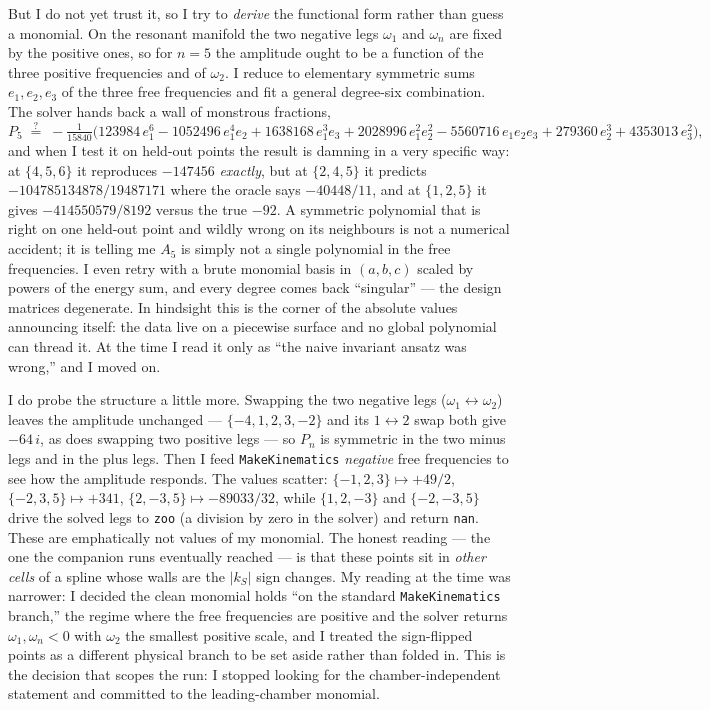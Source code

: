 \documentclass{article}
\begin{document}
But I do not yet trust it, so I try to \emph{derive} the functional form rather
than guess a monomial. On the resonant manifold the two negative legs $\omega_1$
and $\omega_n$ are fixed by the positive ones, so for $n=5$ the amplitude ought to
be a function of the three positive frequencies and of $\omega_2$. I reduce
to elementary symmetric sums $e_1,e_2,e_3$ of the three free frequencies and fit a
general degree-six combination. The solver hands back a wall of monstrous
fractions,
\[
P_5 \;\stackrel{?}{=}\; -\tfrac{1}{15840}\big(123984\,e_1^6 - 1052496\,e_1^4 e_2
+ 1638168\,e_1^3 e_3 + 2028996\,e_1^2 e_2^2 - 5560716\,e_1 e_2 e_3
+ 279360\,e_2^3 + 4353013\,e_3^2\big),
\]
and when I test it on held-out points the result is damning in a very specific
way: at $\{4,5,6\}$ it reproduces $-147456$ \emph{exactly}, but at $\{2,4,5\}$ it
predicts $-104785134878/19487171$ where the oracle says $-40448/11$, and at
$\{1,2,5\}$ it gives $-414550579/8192$ versus the true $-92$. A symmetric
polynomial that is right on one held-out point and wildly wrong on its neighbours
is not a numerical accident; it is telling me $A_5$ is simply not a single
polynomial in the free frequencies. I even retry with a brute monomial basis in
$(a,b,c)$ scaled by powers of the energy sum, and every degree comes back
``singular'' --- the design matrices degenerate. In hindsight this is the corner
of the absolute values announcing itself: the data live on a piecewise surface and
no global polynomial can thread it. At the time I read it only as ``the naive
invariant ansatz was wrong,'' and I moved on.

I do probe the structure a little more. Swapping the two negative legs
($\omega_1\leftrightarrow\omega_2$) leaves the amplitude unchanged ---
$\{-4,1,2,3,-2\}$ and its $1\leftrightarrow2$ swap both give $-64\,i$, as does
swapping two positive legs --- so $P_n$ is symmetric in the two minus legs and in
the plus legs. Then I feed \texttt{MakeKinematics} \emph{negative} free
frequencies to see how the amplitude responds. The values scatter:
$\{-1,2,3\}\mapsto+49/2$, $\{-2,3,5\}\mapsto+341$, $\{2,-3,5\}\mapsto-89033/32$,
while $\{1,2,-3\}$ and $\{-2,-3,5\}$ drive the solved legs to \texttt{zoo} (a
division by zero in the solver) and return \texttt{nan}. These are emphatically
not values of my monomial. The honest reading --- the one the companion runs
eventually reached --- is that these points sit in \emph{other cells} of a spline
whose walls are the $|k_S|$ sign changes. My reading at the time was narrower: I
decided the clean monomial holds ``on the standard \texttt{MakeKinematics}
branch,'' the regime where the free frequencies are positive and the solver
returns $\omega_1,\omega_n<0$ with $\omega_2$ the smallest positive scale, and I
treated the sign-flipped points as a different physical branch to be set aside
rather than folded in. This is the decision that scopes the run: I stopped looking
for the chamber-independent statement and committed to the leading-chamber
monomial.
\end{document}
